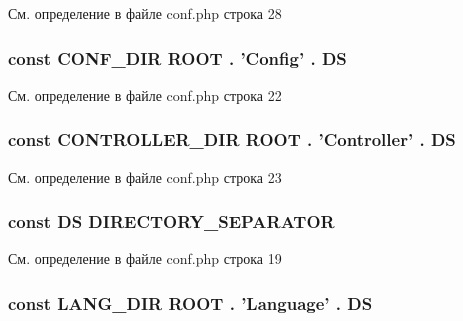 См. определение в файле conf.\-php строка 28

\hypertarget{conf_8php_acc332eaa302e50df333137a1642afc00}{
\subsubsection[{C\-O\-N\-F\-\_\-\-D\-I\-R}]{\setlength{\rightskip}{0pt plus 5cm}const C\-O\-N\-F\-\_\-\-D\-I\-R {\bf R\-O\-O\-T} . '{\bf Config}' . {\bf D\-S}}}\label{conf_8php_acc332eaa302e50df333137a1642afc00}


См. определение в файле conf.\-php строка 22

\hypertarget{conf_8php_a764bb19c7c9d1c48e90b21b30e1b604a}{
\subsubsection[{C\-O\-N\-T\-R\-O\-L\-L\-E\-R\-\_\-\-D\-I\-R}]{\setlength{\rightskip}{0pt plus 5cm}const C\-O\-N\-T\-R\-O\-L\-L\-E\-R\-\_\-\-D\-I\-R {\bf R\-O\-O\-T} . '{\bf Controller}' . {\bf D\-S}}}\label{conf_8php_a764bb19c7c9d1c48e90b21b30e1b604a}


См. определение в файле conf.\-php строка 23

\hypertarget{conf_8php_ae073998f73900b8375397889044c8313}{
\subsubsection[{D\-S}]{\setlength{\rightskip}{0pt plus 5cm}const D\-S D\-I\-R\-E\-C\-T\-O\-R\-Y\-\_\-\-S\-E\-P\-A\-R\-A\-T\-O\-R}}\label{conf_8php_ae073998f73900b8375397889044c8313}


См. определение в файле conf.\-php строка 19

\hypertarget{conf_8php_a62485aa7dd0bdd2703aa8fb69d2ff5d8}{
\subsubsection[{L\-A\-N\-G\-\_\-\-D\-I\-R}]{\setlength{\rightskip}{0pt plus 5cm}const L\-A\-N\-G\-\_\-\-D\-I\-R {\bf R\-O\-O\-T} . 'Language' . {\bf D\-S}}}\label{conf_8php_a62485aa7dd0bdd2703aa8fb69d2ff5d8}


